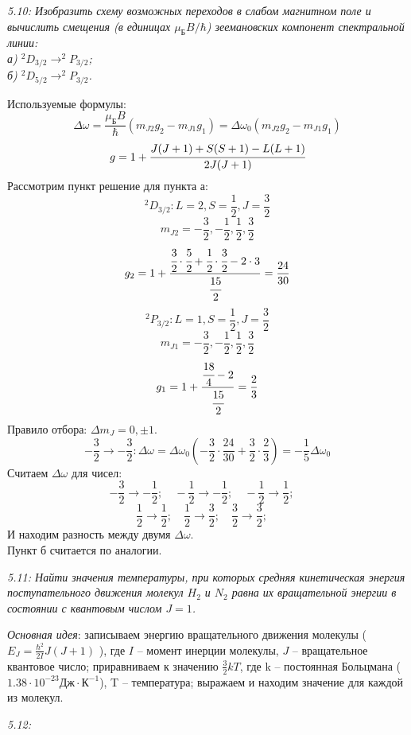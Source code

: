 	\emph{5.10: Изобразить схему возможных переходов в слабом магнитном поле и
        вычислить смещения (в единицах \( \mu_\text{Б}B/\hbar \)) 
        зеемановских компонент спектральной линии: \\
        а) \( ^2D_{3/2} \rightarrow ^2P_{3/2} \);\\
        б) \( ^2D_{5/2} \rightarrow ^2P_{3/2} \).} 

        Используемые формулы: 
		\[ 
			\Delta\omega = \frac{\mu_\text{Б}B}{\hbar}(m_{J2}g_2 - m_{J1}g_1)
			= \Delta\omega_0 (m_{J2}g_2 - m_{J1}g_1)
		\]
		\[ g = 1 + \cfrac{J(J+1)+S(S+1)-L(L+1)}{2J(J+1)} \]
		Рассмотрим пункт решение для пункта а:
		\[ ^2D_{3/2}: L=2, S=\frac{1}{2}, J=\frac{3}{2} \]
		\[ m_{J2} = -\frac{3}{2}, -\frac{1}{2}, \frac{1}{2}, \frac{3}{2} \]
		\[ 
			g_2 = 1 + \frac{\cfrac{3}{2}\cdot\cfrac{5}{2} 
			+ \cfrac{1}{2}\cdot\cfrac{3}{2} - 2\cdot3}{\cfrac{15}{2}} 
			= \frac{24}{30}
		\]
		\[ ^2P_{3/2}: L=1, S=\frac{1}{2}, J=\frac{3}{2} \]
		\[ m_{J1} = -\frac{3}{2}, -\frac{1}{2}, \frac{1}{2}, \frac{3}{2} \]
		\[ g_1 = 1 + \frac{\cfrac{18}{4} - 2}{\cfrac{15}{2}} = \frac{2}{3} \]
		Правило отбора: \( \Delta m_J = 0, \pm1 \).
		\[ -\frac{3}{2} \rightarrow -\frac{3}{2}: 
			\Delta\omega = \Delta\omega_0 (-\frac{3}{2}\cdot\frac{24}{30} 
			+ \frac{3}{2}\cdot\frac{2}{3}) = -\frac{1}{5}\Delta\omega_0 
		\]
		Считаем \( \Delta\omega \) для чисел:
		\[ 
			-\frac{3}{2} \rightarrow -\frac{1}{2};\quad
			-\frac{1}{2} \rightarrow -\frac{1}{2};\quad
			-\frac{1}{2} \rightarrow \frac{1}{2};\quad
		\]
		\[ 
			\frac{1}{2} \rightarrow \frac{1}{2};\quad
			\frac{1}{2} \rightarrow \frac{3}{2};\quad
			\frac{3}{2} \rightarrow \frac{3}{2};\quad
		\]
		И находим разность между двумя \( \Delta\omega \). \\
		Пункт б считается по аналогии.

	\emph{5.11: Найти значения температуры, при которых средняя кинетическая 
        энергия поступательного движения молекул \( H_2 \) и \( N_2 \) равна их вращательной энергии в состоянии с квантовым числом \( J = 1 \).}
		
        \emph{Основная идея}: записываем энергию вращательного движения молекулы
		( \( E_J = \frac{\hbar^2}{2I}J(J+1) \) ), где \( I \) -- 
		момент инерции молекулы, \( J \) -- вращательное квантовое число; 
		приравниваем к значению \( \frac{3}{2} kT \), где k -- постоянная Больцмана 
		(\( 1.38\cdot10^{-23} \text{Дж}\cdot\text{К}^{-1} \)), T -- 
		температура; выражаем и находим значение для каждой из молекул.

	\emph{5.12: } \\

